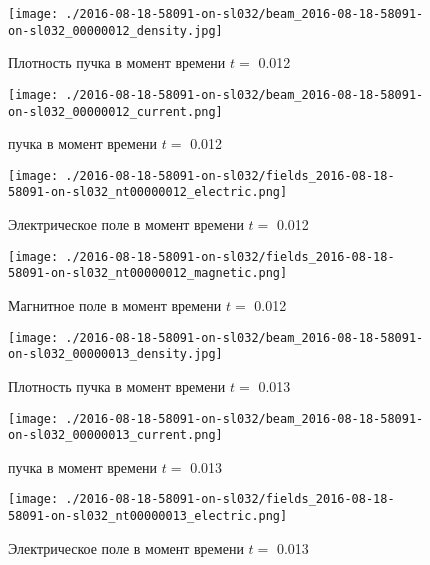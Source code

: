 \documentclass[a4paper,14pt]{extreport}
\begin{document}
\begin{center}
\begin{figure}[!hbt]
\texttt{[image: ./2016-08-18-58091-on-sl032/beam\_2016-08-18-58091-on-sl032\_00000012\_density.jpg]}
\caption{\label{density_beam12_48} Плотность пучка в момент времени $t = $ 0.012 }
\end{figure}
\end{center}
\begin{center}
\begin{figure}[!hbt]
\texttt{[image: ./2016-08-18-58091-on-sl032/beam\_2016-08-18-58091-on-sl032\_00000012\_current.png]}
\caption{\label{current_beam12_49}  пучка в момент времени $t = $ 0.012 }
\end{figure}
\end{center}
\begin{center}
\begin{figure}[!hbt]
\texttt{[image: ./2016-08-18-58091-on-sl032/fields\_2016-08-18-58091-on-sl032\_nt00000012\_electric.png]}
\caption{\label{electric_12_50} Электрическое поле  в момент времени $t = $ 0.012 }
\end{figure}
\end{center}
\begin{center}
\begin{figure}[!hbt]
\texttt{[image: ./2016-08-18-58091-on-sl032/fields\_2016-08-18-58091-on-sl032\_nt00000012\_magnetic.png]}
\caption{\label{magnetic_12_51} Магнитное поле  в момент времени $t = $ 0.012 }
\end{figure}
\end{center}
\begin{center}
\begin{figure}[!hbt]
\texttt{[image: ./2016-08-18-58091-on-sl032/beam\_2016-08-18-58091-on-sl032\_00000013\_density.jpg]}
\caption{\label{density_beam13_52} Плотность пучка в момент времени $t = $ 0.013 }
\end{figure}
\end{center}
\begin{center}
\begin{figure}[!hbt]
\texttt{[image: ./2016-08-18-58091-on-sl032/beam\_2016-08-18-58091-on-sl032\_00000013\_current.png]}
\caption{\label{current_beam13_53}  пучка в момент времени $t = $ 0.013 }
\end{figure}
\end{center}
\begin{center}
\begin{figure}[!hbt]
\texttt{[image: ./2016-08-18-58091-on-sl032/fields\_2016-08-18-58091-on-sl032\_nt00000013\_electric.png]}
\caption{\label{electric_13_54} Электрическое поле  в момент времени $t = $ 0.013 }
\end{figure}
\end{center}
\end{document}
